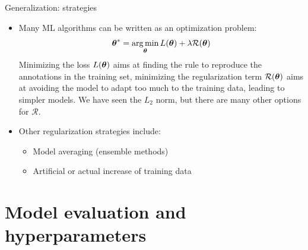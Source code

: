 \documentclass[xcolor=pdftex,dvipsnames,table]{beamer}
\begin{document}
\begin{frame}{Generalization: strategies}
\begin{itemize}
\item Many ML algorithms can be written as an optimization problem:
\begin{equation*}
\boldsymbol{\theta} ^{\ast} = \operatorname*{arg\,min}_{\boldsymbol{\theta}} L (\boldsymbol{\theta}) + \lambda \mathcal{R}(\boldsymbol{\theta})
\end{equation*}
Minimizing the loss $L (\boldsymbol{\theta})$ aims at finding the rule to reproduce the annotations in the training set, minimizing the regularization term $\mathcal{R}(\boldsymbol{\theta})$ aims at avoiding the model to adapt too much to the training data, leading to simpler models. We have seen the $L_2$ norm, but there are many other options for $\mathcal{R}$.
\item Other regularization strategies include:
\begin{itemize}
\item Model averaging (ensemble methods)
\item Artificial or actual increase of training data
\end{itemize}
\end{itemize}
\end{frame}

\section{Model evaluation and hyperparameters}


\end{document}
